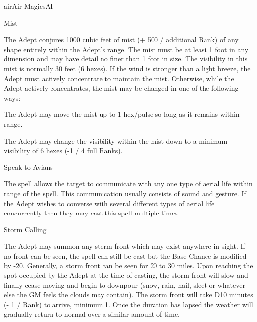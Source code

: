\begin{college}[2.1]{air}{Air Magics}{AI}
\begin{spell}[G-4]{Mist}

\begin{effects}
The Adept conjures 1000 cubic feet of mist (+ 500 / additional Rank) of
any shape entirely within the Adept's range. The mist must be at least
1 foot in any dimension and may have detail no finer than 1 foot in
size. The visibility in this mist is normally 30 feet (6 hexes). If
the wind is stronger than a light breeze, the Adept must actively
concentrate to maintain the mist. Otherwise, while the Adept actively
concentrates, the mist may be changed in one of the following ways:
\begin{Enumerate}
\item
The Adept may move the mist up to 1 hex/pulse so long as it remains
within range.
\item
The Adept may change the visibility within the mist down to a minimum
visibility of 6 hexes (-1 / 4 full Ranks).
\end{Enumerate}
\end{effects}
\end{spell}

\begin{spell}[G-5]{Speak to Avians}

\begin{effects}
The spell allows the target to communicate with any one type of aerial
life within range of the spell. This communication usually consists of
sound and gesture. If the Adept wishes to converse with several
different types of aerial life concurrently then they may cast this
spell multiple times.
\end{effects}
\end{spell}

\begin{spell}[G-6]{Storm Calling}

\begin{effects}
The Adept may summon any storm front which may exist anywhere in
sight. If no front can be seen, the spell can still be cast but the
Base Chance is modified by -20. Generally, a storm front can be seen
for 20 to 30 miles. Upon reaching the spot occupied by the Adept at
the time of casting, the storm front will slow and finally cease
moving and begin to downpour (snow, rain, hail, sleet or whatever else
the GM feels the clouds may contain). The storm front will take D10  minutes (- 1 / Rank) to arrive, minimum 1. Once the duration has lapsed
the weather will gradually return to normal over a similar amount of
time.
\end{effects}
\end{spell}


\end{college}
